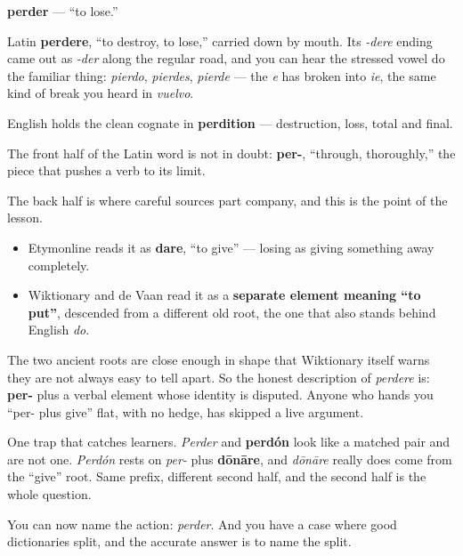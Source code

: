 \begin{cousinweb}
\textbf{perder} — \textquotedblleft{}to lose.\textquotedblright{}

Latin \textbf{perdere}, \textquotedblleft{}to destroy, to lose,\textquotedblright{} carried down by mouth. Its \emph{-dere} ending came out as \emph{-der} along the regular road, and you can hear the stressed vowel do the familiar thing: \emph{pierdo}, \emph{pierdes}, \emph{pierde} — the \emph{e} has broken into \emph{ie}, the same kind of break you heard in \emph{vuelvo}.

English holds the clean cognate in \textbf{perdition} — destruction, loss, total and final.

The front half of the Latin word is not in doubt: \textbf{per-}, \textquotedblleft{}through, thoroughly,\textquotedblright{} the piece that pushes a verb to its limit.

The back half is where careful sources part company, and this is the point of the lesson.

\begin{itemize}
\raggedright
  \item Etymonline reads it as \textbf{dare}, \textquotedblleft{}to give\textquotedblright{} — losing as giving something away completely.
  \item Wiktionary and de Vaan read it as a \textbf{separate element meaning \textquotedblleft{}to put\textquotedblright{}}, descended from a different old root, the one that also stands behind English \emph{do}.
\end{itemize}

The two ancient roots are close enough in shape that Wiktionary itself warns they are not always easy to tell apart. So the honest description of \emph{perdere} is: \textbf{per-} plus a verbal element whose identity is disputed. Anyone who hands you \textquotedblleft{}per- plus give\textquotedblright{} flat, with no hedge, has skipped a live argument.

One trap that catches learners. \emph{Perder} and \textbf{perdón} look like a matched pair and are not one. \emph{Perdón} rests on \emph{per-} plus \textbf{dōnāre}, and \emph{dōnāre} really does come from the \textquotedblleft{}give\textquotedblright{} root. Same prefix, different second half, and the second half is the whole question.
\end{cousinweb}

\begin{grammarlens}[title={What you've built}]
You can now name the action: \emph{perder}. And you have a case where good dictionaries split, and the accurate answer is to name the split.
\end{grammarlens}

